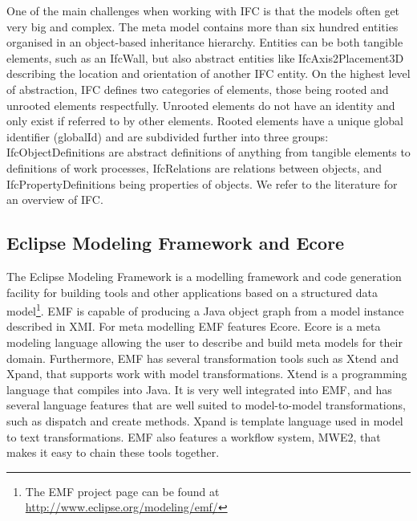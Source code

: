 One of the main challenges when working with IFC is that the models often get very big and complex. The meta model contains more than six hundred entities organised in an object-based inheritance hierarchy. Entities can be both tangible elements, such as an IfcWall, but also abstract entities like IfcAxis2Placement3D describing the location and orientation of another IFC entity. On the highest level of abstraction, IFC defines two categories of elements, those being rooted and unrooted elements respectfully. Unrooted elements do not have an identity and only exist if referred to by other elements. Rooted elements have a unique global identifier (globalId) and are subdivided further into three groups: IfcObjectDefinitions are abstract definitions of anything from tangible elements to definitions of work processes, IfcRelations are relations between objects, and IfcPropertyDefinitions being properties of objects. We refer to the literature for an overview of IFC.

\subsection{Eclipse Modeling Framework and Ecore}
The Eclipse Modeling Framework is a modelling framework and code generation facility for building tools and other applications based on a structured data model\footnote{The EMF project page can be found at \url{http://www.eclipse.org/modeling/emf/}}. EMF is capable of producing a Java object graph from a model instance described in XMI. For meta modelling EMF features Ecore. Ecore is a meta modeling language allowing the user to describe and build meta models for their domain. Furthermore, EMF has several transformation tools such as Xtend and Xpand, that supports work with model transformations. Xtend is a programming language that compiles into Java. It is very well integrated into EMF, and has several language features that are well suited to model-to-model transformations, such as dispatch and create methods. Xpand is template language used in model to text transformations. EMF also features a workflow system, MWE2, that makes it easy to chain these tools together.
